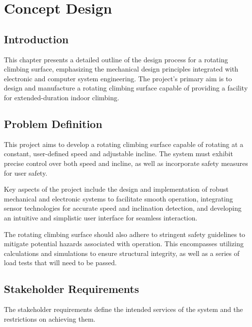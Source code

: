 \chapter{Concept Design}
\label{chap:concept_design}

\section{Introduction}

This chapter presents a detailed outline of the design process for a rotating climbing surface, emphasizing the mechanical design principles integrated with electronic and computer system engineering. The project's primary aim is to design and manufacture a rotating climbing surface capable of providing a facility for extended-duration indoor climbing.

\section{Problem Definition}
\label{sec:problem_definition}

This project aims to develop a rotating climbing surface capable of rotating at a constant, user-defined speed and adjustable incline. The system must exhibit precise control over both speed and incline, as well as incorporate safety measures for user safety.

Key aspects of the project include the design and implementation of robust mechanical and electronic systems to facilitate smooth operation, integrating sensor technologies for accurate speed and inclination detection, and developing an intuitive and simplistic user interface for seamless interaction.

The rotating climbing surface should also adhere to stringent safety guidelines to mitigate potential hazards associated with operation. This encompasses utilizing calculations and simulations to ensure structural integrity, as well as a series of load tests that will need to be passed.

\section{Stakeholder Requirements}

The stakeholder requirements define the intended services of the system and the restrictions on achieving them.

